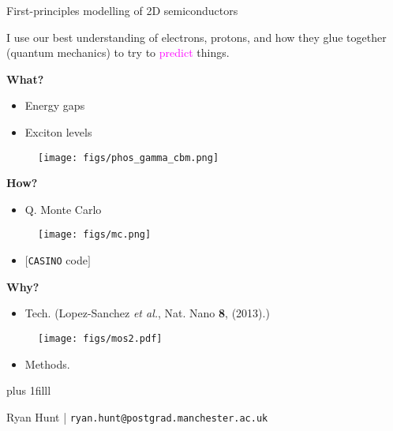 \documentclass{beamer}
\newcommand{\btVFill}{\vskip0pt plus 1filll}
\begin{document}
\begin{frame}[t]{First-principles modelling of 2D semiconductors}

I use our best understanding of electrons, protons, and how they glue together
(quantum mechanics) to try to \textcolor{magenta}{predict} things.
\vspace{.4cm}

\begin{minipage}[t]{0.33\textwidth}

\begin{center}
{\bf What?}
\begin{itemize}
  \item Energy gaps
  \item Exciton levels
\end{itemize}

\begin{figure}[h]
  \centering
  \texttt{[image: figs/phos\_gamma\_cbm.png]}
\end{figure}

\end{center}

\end{minipage}%
\hfill
\begin{minipage}[t]{0.33\textwidth}

\begin{center}
{\bf How?}
\begin{itemize}
  \item Q. Monte Carlo
\end{itemize}
\begin{figure}[h]
  \centering
  \texttt{[image: figs/mc.png]}
\end{figure}
\begin{itemize}
  \item $[$\texttt{CASINO} code$]$
\end{itemize}
\end{center}

\end{minipage}%
\hfill
\begin{minipage}[t]{0.33\textwidth}

\begin{center}
{\bf Why?}
\begin{itemize}
  \item Tech. {\tiny (Lopez-Sanchez {\it et al.}, Nat. Nano {\bf 8},
  (2013).)}
\end{itemize}
\begin{figure}[h]
  \centering
  \texttt{[image: figs/mos2.pdf]}
\end{figure}
\begin{itemize}
  \item Methods.
\end{itemize}


\end{center}

\end{minipage}%

\btVFill

\centering
Ryan Hunt | \texttt{ryan.hunt@postgrad.manchester.ac.uk}

\end{frame}
\end{document}
